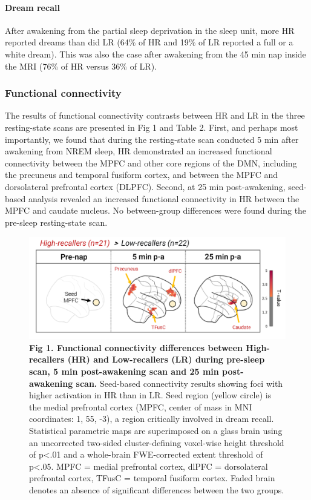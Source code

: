 \paragraph{Dream recall}
After awakening from the partial sleep deprivation in the sleep unit, more HR reported dreams than did LR (64\% of HR and 19\% of LR reported a full or a white dream). This was also the case after awakening from the 45 min nap inside the MRI (76\% of HR versus 36\% of LR).

\subsubsection*{Functional connectivity}
The results of functional connectivity contrasts between HR and LR in the three resting-state scans are presented in Fig 1 and Table 2. First, and perhaps most importantly, we found that during the resting-state scan conducted 5 min after awakening from NREM sleep, HR demonstrated an increased functional connectivity between the MPFC and other core regions of the DMN, including the precuneus and temporal fusiform cortex, and between the MPFC and dorsolateral prefrontal cortex (DLPFC). Second, at 25 min post-awakening, seed-based analysis revealed an increased functional connectivity in HR between the MPFC and caudate nucleus. No between-group differences were found during the pre-sleep resting-state scan.

\begin{figure}[!htbp]
	\includegraphics[width=\textwidth]{Fig/Results/Inertia/DRF/Fig1.png}
	\caption*{\textbf{Fig 1. Functional connectivity differences between High-recallers (HR) and Low-recallers (LR) during pre-sleep scan, 5 min post-awakening scan and 25 min post-awakening scan.} Seed-based connectivity results showing foci with higher activation in HR than in LR. Seed region (yellow circle) is the medial prefrontal cortex (MPFC, center of mass in MNI coordinates: 1, 55, -3), a region critically involved in dream recall. Statistical parametric maps are superimposed on a glass brain using an uncorrected two-sided cluster-defining voxel-wise height threshold of p<.01 and a whole-brain FWE-corrected extent threshold of p<.05. MPFC = medial prefrontal cortex, dlPFC = dorsolateral prefrontal cortex, TFusC = temporal fusiform cortex. Faded brain denotes an absence of significant differences between the two groups.}
\end{figure}

